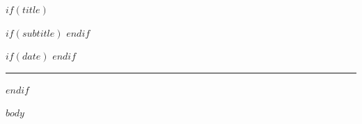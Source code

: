 \documentclass[9pt]{article}
\begin{document}
$if(title)$

$if(subtitle)$
\smallskip
{}
$endif$

$if(date)$
\smallskip
{}
$endif$

\vspace{0.3em}
\hrule
\vspace{0.3em}
$endif$

$body$
\end{document}
